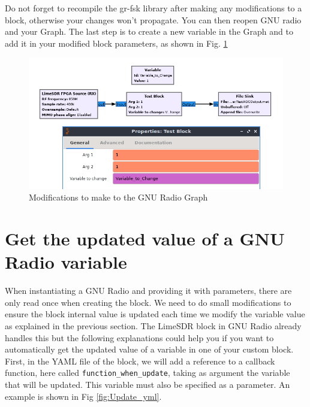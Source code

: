 Do not forget to recompile the gr-fsk library after making any modifications to a block, otherwise your changes won't propagate. You can then reopen GNU radio and your Graph. The last step is to create a new variable in the Graph and to add it in your modified block parameters, as shown in Fig. \ref{fig:Callback_graph}

 \begin{figure}[H]
    \centering
    \includegraphics[scale=0.55]{figures/Callback_graph.png}
    \caption{Modifications to make to the GNU Radio Graph}
    \label{fig:Callback_graph}
\end{figure}

\section{Get the updated value of a GNU Radio variable}

When instantiating a GNU Radio and providing it with parameters, there are only read once when creating the block. We need to do small modifications to ensure the block internal value is updated each time we modify the variable value as explained in the previous section. The LimeSDR block in GNU Radio already handles this but the following explanations could help you if you want to automatically get the updated value of a variable in one of your custom block. \\

First, in the YAML file of the block, we will add  a reference to a callback function, here called \texttt{function\_when\_update}, taking as argument the variable that will be updated. This variable must also be specified as a parameter. An example is shown in Fig \ref{fig:Update_yml}.

